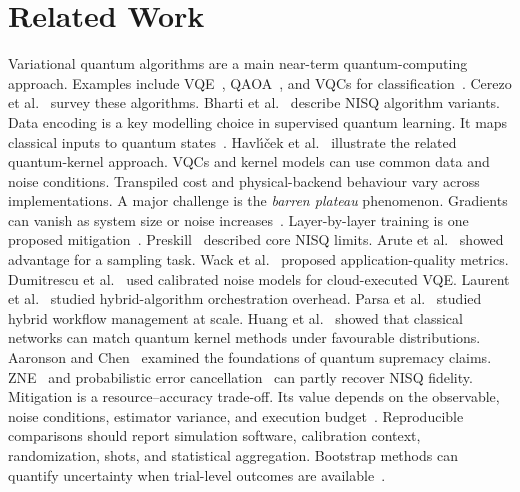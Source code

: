 \documentclass[final,5p,times,number]{elsarticle}
\begin{document}
\section{Related Work}
\label{sec:related}

Variational quantum algorithms are a main near-term quantum-computing approach. Examples include VQE~\cite{peruzzo2014variational}, QAOA~\cite{farhi2014qaoa}, and VQCs for classification~\cite{havlicek2019featuremaps}. Cerezo et al.~\cite{cerezo2021variational} survey these algorithms. Bharti et al.~\cite{bharti2022noisy} describe NISQ algorithm variants. Data encoding is a key modelling choice in supervised quantum learning. It maps classical inputs to quantum states~\cite{schuld2019feature_hilbert,lloyd2020embeddings}. Havl\'{\i}\v{c}ek et al.~\cite{havlicek2019featuremaps} illustrate the related quantum-kernel approach. VQCs and kernel models can use common data and noise conditions. Transpiled cost and physical-backend behaviour vary across implementations. A major challenge is the \emph{barren plateau} phenomenon. Gradients can vanish as system size or noise increases~\cite{mcclean2018barren,wang2021noise_barren}. Layer-by-layer training is one proposed mitigation~\cite{skolik2021layerwise}. Preskill~\cite{preskill2018nisq} described core NISQ limits. Arute et al.~\cite{arute2019supremacy} showed advantage for a sampling task. Wack et al.~\cite{wack2021quality} proposed application-quality metrics. Dumitrescu et al.~\cite{dumitrescu2018cloud} used calibrated noise models for cloud-executed VQE. Laurent et al.~\cite{laurent2021orchestrating} studied hybrid-algorithm orchestration overhead. Parsa et al.~\cite{parsa2022workflow} studied hybrid workflow management at scale. Huang et al.~\cite{huang2021power} showed that classical networks can match quantum kernel methods under favourable distributions. Aaronson and Chen~\cite{aaronson2020supremacy} examined the foundations of quantum supremacy claims. ZNE~\cite{temme2017error,kim2023scalable_mitigation} and probabilistic error cancellation~\cite{endo2021mitigation} can partly recover NISQ fidelity. Mitigation is a resource--accuracy trade-off. Its value depends on the observable, noise conditions, estimator variance, and execution budget~\cite{temme2017error,endo2021mitigation,kim2023scalable_mitigation}. Reproducible comparisons should report simulation software, calibration context, randomization, shots, and statistical aggregation. Bootstrap methods can quantify uncertainty when trial-level outcomes are available~\cite{efron1987bootstrap}.
\end{document}
